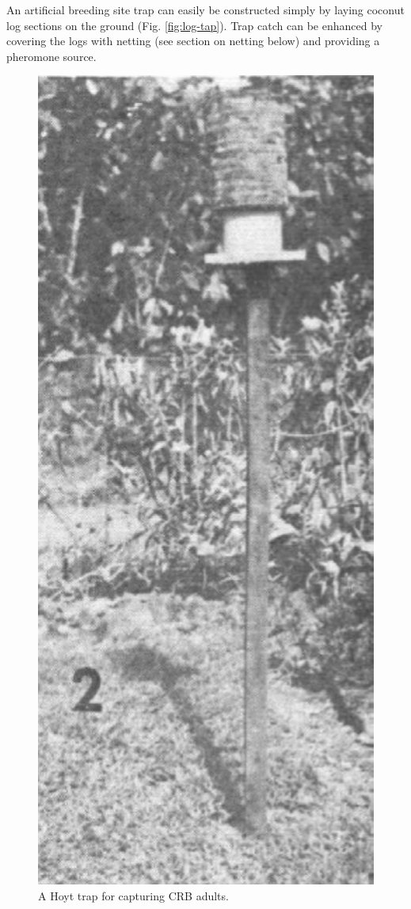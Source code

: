 \documentclass[twocolumn,letterpaper]{scrartcl}
\begin{document}
An artificial breeding site trap can easily be constructed simply by laying coconut log sections on the ground (Fig. \ref{fig:log-tap}). Trap catch can be enhanced by covering the logs with netting (see section on netting below) and providing a pheromone source.
\begin{figure}[h]
	\centering
	\includegraphics[width=0.7\linewidth]{images/hoyt-trap}
	\caption{A Hoyt trap for capturing CRB adults.}
	\label{fig:hoyt-trap}
\end{figure}
\end{document}
